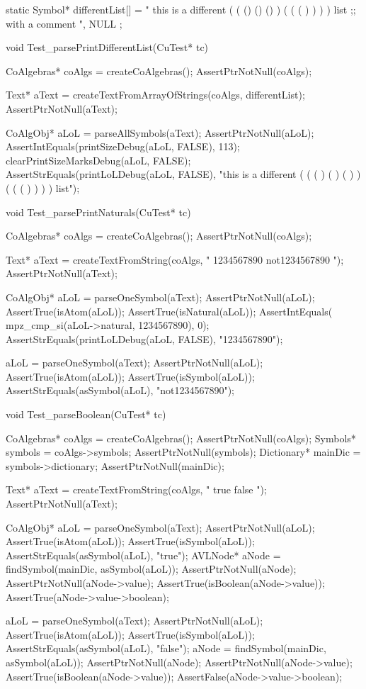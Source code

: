 static Symbol* differentList[] = {
 " this is  a different ( ( () () () ) ( ( ( ) ) ) ) list ;; with a comment  ",
 NULL
};

void Test_parsePrintDifferentList(CuTest* tc) {
  CoAlgebras* coAlgs = createCoAlgebras();
  AssertPtrNotNull(coAlgs);

  Text* aText = createTextFromArrayOfStrings(coAlgs, differentList);
  AssertPtrNotNull(aText);

  CoAlgObj* aLoL = parseAllSymbols(aText);
  AssertPtrNotNull(aLoL);
  AssertIntEquals(printSizeDebug(aLoL, FALSE), 113);
  clearPrintSizeMarksDebug(aLoL, FALSE);
  AssertStrEquals(printLoLDebug(aLoL, FALSE),
    "this is a different ( ( ( ) ( ) ( ) ) ( ( ( ) ) ) ) list");
}

void Test_parsePrintNaturals(CuTest* tc) {
  CoAlgebras* coAlgs = createCoAlgebras();
  AssertPtrNotNull(coAlgs);

  Text* aText = createTextFromString(coAlgs, " 1234567890 not1234567890 ");
  AssertPtrNotNull(aText);

  CoAlgObj* aLoL = parseOneSymbol(aText);
  AssertPtrNotNull(aLoL);
  AssertTrue(isAtom(aLoL));
  AssertTrue(isNatural(aLoL));
  AssertIntEquals( mpz_cmp_si(aLoL->natural, 1234567890), 0);
  AssertStrEquals(printLoLDebug(aLoL, FALSE), "1234567890");

  aLoL = parseOneSymbol(aText);
  AssertPtrNotNull(aLoL);
  AssertTrue(isAtom(aLoL));
  AssertTrue(isSymbol(aLoL));
  AssertStrEquals(asSymbol(aLoL), "not1234567890");
}

void Test_parseBoolean(CuTest* tc) {
  CoAlgebras* coAlgs = createCoAlgebras();
  AssertPtrNotNull(coAlgs);
  Symbols* symbols = coAlgs->symbols;
  AssertPtrNotNull(symbols);
  Dictionary* mainDic = symbols->dictionary;
  AssertPtrNotNull(mainDic);

  Text* aText = createTextFromString(coAlgs, " true false ");
  AssertPtrNotNull(aText);

  CoAlgObj* aLoL = parseOneSymbol(aText);
  AssertPtrNotNull(aLoL);
  AssertTrue(isAtom(aLoL));
  AssertTrue(isSymbol(aLoL));
  AssertStrEquals(asSymbol(aLoL), "true");
  AVLNode* aNode = findSymbol(mainDic, asSymbol(aLoL));
  AssertPtrNotNull(aNode);
  AssertPtrNotNull(aNode->value);
  AssertTrue(isBoolean(aNode->value));
  AssertTrue(aNode->value->boolean);

  aLoL = parseOneSymbol(aText);
  AssertPtrNotNull(aLoL);
  AssertTrue(isAtom(aLoL));
  AssertTrue(isSymbol(aLoL));
  AssertStrEquals(asSymbol(aLoL), "false");
  aNode = findSymbol(mainDic, asSymbol(aLoL));
  AssertPtrNotNull(aNode);
  AssertPtrNotNull(aNode->value);
  AssertTrue(isBoolean(aNode->value));
  AssertFalse(aNode->value->boolean);
}

